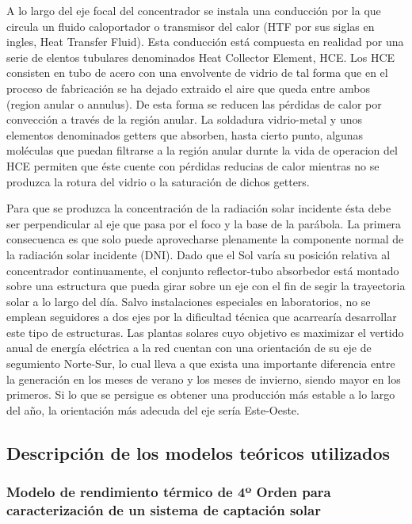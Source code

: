 \documentclass[11pt]{article}
\begin{document}
A lo largo del eje focal del concentrador se instala una conducción por
la que circula un fluido caloportador o transmisor del calor (HTF por
sus siglas en ingles, Heat Transfer Fluid). Esta conducción está
compuesta en realidad por una serie de elentos tubulares denominados
Heat Collector Element, HCE. Los HCE consisten en tubo de acero con una
envolvente de vidrio de tal forma que en el proceso de fabricación se ha
dejado extraido el aire que queda entre ambos (region anular o annulus).
De esta forma se reducen las pérdidas de calor por convección a través
de la región anular. La soldadura vidrio-metal y unos elementos
denominados getters que absorben, hasta cierto punto, algunas moléculas
que puedan filtrarse a la región anular durnte la vida de operacion del
HCE permiten que éste cuente con pérdidas reducias de calor mientras no
se produzca la rotura del vidrio o la saturación de dichos getters.

Para que se produzca la concentración de la radiación solar incidente
ésta debe ser perpendicular al eje que pasa por el foco y la base de la
parábola. La primera consecuenca es que solo puede aprovecharse
plenamente la componente normal de la radiación solar incidente (DNI).
Dado que el Sol varía su posición relativa al concentrador
continuamente, el conjunto reflector-tubo absorbedor está montado sobre
una estructura que pueda girar sobre un eje con el fin de segir la
trayectoria solar a lo largo del día. Salvo instalaciones especiales en
laboratorios, no se emplean seguidores a dos ejes por la dificultad
técnica que acarrearía desarrollar este tipo de estructuras. Las plantas
solares cuyo objetivo es maximizar el vertido anual de energía eléctrica
a la red cuentan con una orientación de su eje de segumiento Norte-Sur,
lo cual lleva a que exista una importante diferencia entre la generación
en los meses de verano y los meses de invierno, siendo mayor en los
primeros. Si lo que se persigue es obtener una producción más estable a
lo largo del año, la orientación más adecuda del eje sería Este-Oeste.

    \hypertarget{descripciuxf3n-de-los-modelos-teuxf3ricos-utilizados}{%
\subsection{Descripción de los modelos teóricos
utilizados}\label{descripciuxf3n-de-los-modelos-teuxf3ricos-utilizados}}

\hypertarget{modelo-de-rendimiento-tuxe9rmico-de-4uxba-orden-para-caracterizaciuxf3n-de-un-sistema-de-captaciuxf3n-solar}{%
\subsubsection{Modelo de rendimiento térmico de 4º Orden para
caracterización de un sistema de captación
solar}\label{modelo-de-rendimiento-tuxe9rmico-de-4uxba-orden-para-caracterizaciuxf3n-de-un-sistema-de-captaciuxf3n-solar}}
\end{document}
